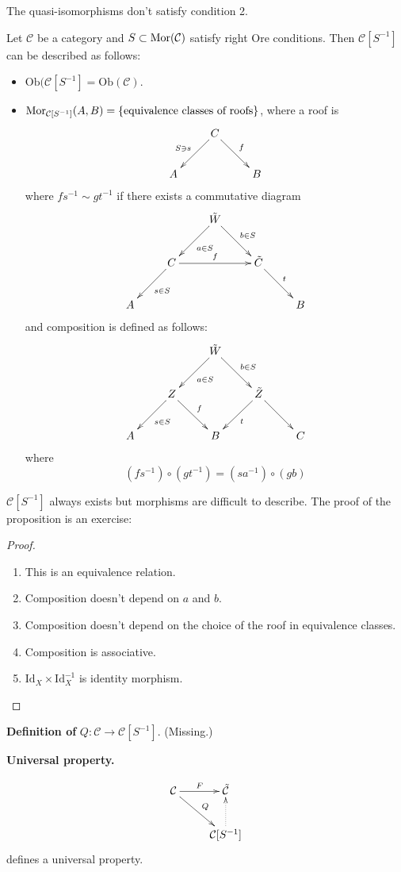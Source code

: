 The quasi-isomorphisms don't satisfy
condition 2.

\begin{proposition}
\label{dcos-label-003}
Let $\mathcal{C}$ be a category and $S\subset
\mathop{\mathrm{Mor}}\nolimits(\mathcal{C})$ satisfy right Ore
conditions. Then $\mathcal{C}[S^{-1}]$ can be
described as follows:
\begin{itemize}
\item
$\text{Ob}(\mathcal{C}[S^{-1}]=\text{Ob}
(\mathcal{C})$.
\item
$\mathop{\mathrm{Mor}}\nolimits_{\mathcal{C}[S^{-1}]}(A,B)=
\{\text{equivalence
classes of
roofs}\}$, where a roof is
$$
\xymatrix{
& C\ar[dl]_{S \ni s}\ar[dr]^{f}\\
A&&B
}
$$
where $fs^{-1}\sim gt^{-1}$ if there exists a
commutative diagram
$$
\xymatrix{
& & \tilde{W} \ar[ld]^{a \in S} \ar[dr]^{b
\in S} & & \\
& C \ar[ld]^{s \in S} \ar[rr]^{f} & &
\tilde{C} \ar[rd]^{t} & \\
A & & & & B
}
$$
and composition is defined as follows:
$$
\xymatrix{
& & \tilde{W}\ar[ld]^{a \in S}\ar[dr]^{b \in
S}\\
&Z\ar[ld]^{s \in S}\ar[dr]^{f} & &
\tilde{Z}\ar[dr]\ar[dl]^{t}\\
A & &B & & C
}
$$
where
$$
(fs^{-1})\circ (gt^{-1})=(sa^{-1})\circ(gb)
$$
\end{itemize}
\end{proposition}

$\mathcal{C}[S^{-1}]$ always exists but
morphisms are difficult to describe. The
proof of the proposition is an exercise:

\begin{proof}
\begin{enumerate}
\item This is an equivalence relation.
\item Composition doesn't depend on $a$ and
$b$.
\item Composition doesn't depend on the
choice of the roof in equivalence
classes.
\item Composition is associative.
\item $\text{Id}_X \times \text{Id}_X^{-1}$
is identity morphism.
\end{enumerate}
\end{proof}

{\bf Definition of} $Q:\mathcal{C} \to
\mathcal{C}[S^{-1}]$. (Missing.)

{\bf Universal property.}

$$
\xymatrix{
\mathcal{C}\ar[r]^{F}\ar[dr]^{Q}&
\tilde{\mathcal{C}}\\
&\mathcal{C}[S^{-1}]\ar@{.>}[u]
}
$$
defines a universal property.

